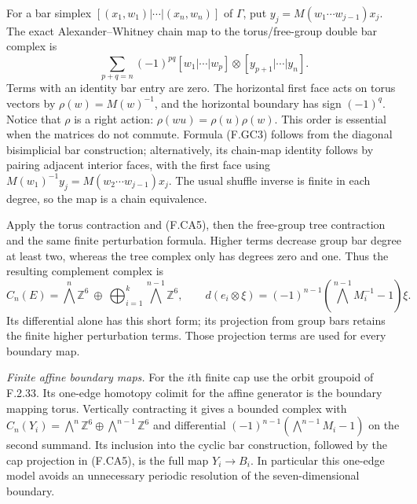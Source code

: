 For a bar simplex $[(x_1,w_1)|\cdots|(x_n,w_n)]$ of $\Gamma$,
put $y_j=M(w_1\cdots w_{j-1})x_j$.
The exact Alexander--Whitney chain map to the torus/free-group
double bar complex is
\[
 \sum_{p+q=n}(-1)^{pq}
 [w_1|\cdots|w_p]\otimes[y_{p+1}|\cdots|y_n].              \tag{F.GC3}
\]
Terms with an identity bar entry are zero.  The horizontal
first face acts on torus vectors by
$\rho(w)=M(w)^{-1}$, and the horizontal boundary has sign
$(-1)^q$.  Notice that $\rho$ is a right action:
$\rho(wu)=\rho(u)\rho(w)$.  This order is essential when
the matrices do not commute.  Formula (F.GC3) follows from
the diagonal bisimplicial bar construction; alternatively,
its chain-map identity follows by pairing adjacent interior
faces, with the first face using
$M(w_1)^{-1}y_j=M(w_2\cdots w_{j-1})x_j$.
The usual shuffle inverse is finite in each degree, so the
map is a chain equivalence.

Apply the torus contraction and (F.CA5), then the free-group
tree contraction and the same finite perturbation formula.
Higher terms decrease group bar degree at least two, whereas
the tree complex only has degrees zero and one.  Thus the
resulting complement complex is
\[
 C_n(E)=\bigwedge^n\mathbb Z^6\ \oplus\
 \bigoplus_{i=1}^k\bigwedge^{n-1}\mathbb Z^6,
 \qquad
 d(e_i\otimes\xi)=(-1)^{n-1}
   (\bigwedge^{n-1}M_i^{-1}-1)\xi.                         \tag{F.GC4}
\]
Its differential alone has this short form; its projection
from group bars retains the finite higher perturbation terms.
Those projection terms are used for every boundary map.

\emph{Finite affine boundary maps.}
For the $i$th finite cap use the orbit groupoid of F.2.33.
Its one-edge homotopy colimit for the affine generator is
the boundary mapping torus.  Vertically contracting it gives
a bounded complex with
$C_n(Y_i)=\bigwedge^n\mathbb Z^6\oplus
\bigwedge^{n-1}\mathbb Z^6$ and differential
$(-1)^{n-1}(\bigwedge^{n-1}M_i-1)$ on the second summand.
Its inclusion into the cyclic bar construction, followed by
the cap projection in (F.CA5), is the full map $Y_i\to B_i$.
In particular this one-edge model avoids an unnecessary
periodic resolution of the seven-dimensional boundary.

